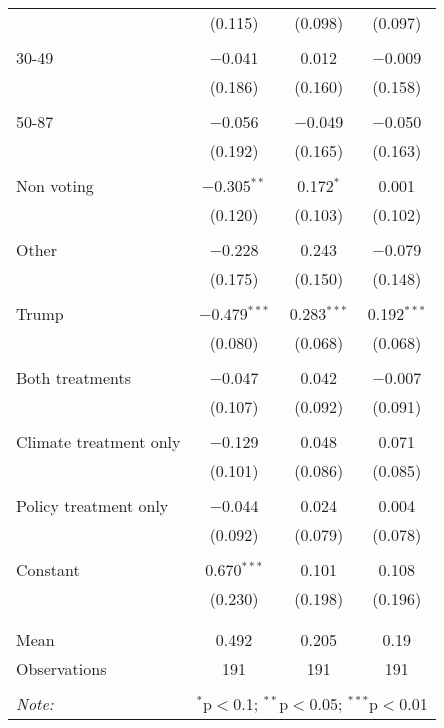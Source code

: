 \begin{tabular}{@{\extracolsep{5pt}}lccc}
  & (0.115) & (0.098) & (0.097) \\ 
  & & & \\ 
 30-49 & $-$0.041 & 0.012 & $-$0.009 \\ 
  & (0.186) & (0.160) & (0.158) \\ 
  & & & \\ 
 50-87 & $-$0.056 & $-$0.049 & $-$0.050 \\ 
  & (0.192) & (0.165) & (0.163) \\ 
  & & & \\ 
 Non voting & $-$0.305$^{**}$ & 0.172$^{*}$ & 0.001 \\ 
  & (0.120) & (0.103) & (0.102) \\ 
  & & & \\ 
 Other & $-$0.228 & 0.243 & $-$0.079 \\ 
  & (0.175) & (0.150) & (0.148) \\ 
  & & & \\ 
 Trump & $-$0.479$^{***}$ & 0.283$^{***}$ & 0.192$^{***}$ \\ 
  & (0.080) & (0.068) & (0.068) \\ 
  & & & \\ 
 Both treatments & $-$0.047 & 0.042 & $-$0.007 \\ 
  & (0.107) & (0.092) & (0.091) \\ 
  & & & \\ 
 Climate treatment only & $-$0.129 & 0.048 & 0.071 \\ 
  & (0.101) & (0.086) & (0.085) \\ 
  & & & \\ 
 Policy treatment only & $-$0.044 & 0.024 & 0.004 \\ 
  & (0.092) & (0.079) & (0.078) \\ 
  & & & \\ 
 Constant & 0.670$^{***}$ & 0.101 & 0.108 \\ 
  & (0.230) & (0.198) & (0.196) \\ 
  & & & \\ 
\hline \\[-1.8ex] 
Mean & 0.492 & 0.205 & 0.19 \\ 
Observations & 191 & 191 & 191 \\ 
\hline 
\hline \\[-1.8ex] 
\textit{Note:}  & \multicolumn{3}{r}{$^{*}$p$<$0.1; $^{**}$p$<$0.05; $^{***}$p$<$0.01} \\ 
\end{tabular} 
